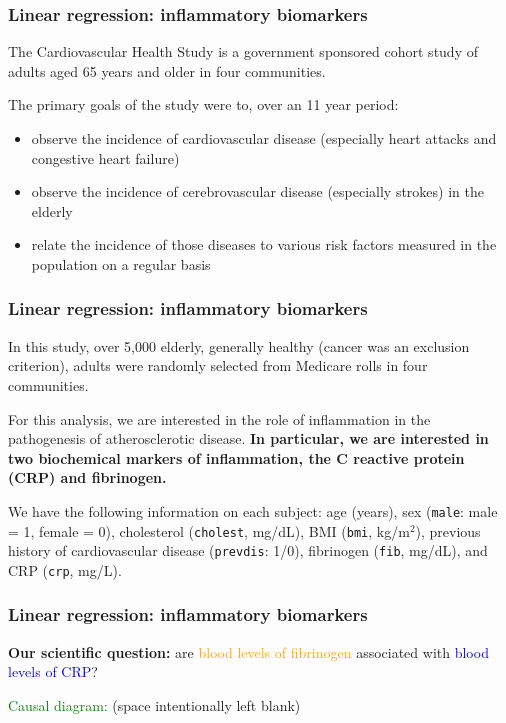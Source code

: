 \documentclass[12pt, 
hyperref={colorlinks=true, linkcolor=blue, urlcolor=cyan},dvipsnames]{beamer}
\begin{document}
\begin{frame}
\frametitle{Linear regression: inflammatory biomarkers}
The Cardiovascular Health Study is a government sponsored cohort study of adults aged 65 years and older in four communities.

The primary goals of the study were to, over an 11 year period:\vspace{-0.3cm}
\begin{itemize}
\item observe the incidence of cardiovascular disease (especially heart attacks and congestive heart failure)
\item observe the incidence of cerebrovascular disease (especially strokes) in the elderly 
\item relate the incidence of those diseases to various risk factors measured in the population on a regular basis
\end{itemize}
\end{frame}

\begin{frame}
\frametitle{Linear regression: inflammatory biomarkers}
In this study, over 5,000 elderly, generally healthy (cancer was an exclusion criterion), adults were randomly selected from Medicare rolls in four communities.

For this analysis, we are interested in the role of inflammation in the pathogenesis of atherosclerotic disease. \textbf{In particular, we are interested in two biochemical markers of inflammation, the C reactive protein (CRP) and fibrinogen.}

We have the following information on each subject: age (years), sex (\texttt{male}: male = 1, female = 0), cholesterol (\texttt{cholest}, mg/dL), BMI (\texttt{bmi}, kg/m${}^2$), previous history of cardiovascular disease (\texttt{prevdis}: 1/0), fibrinogen (\texttt{fib}, mg/dL), and CRP (\texttt{crp}, mg/L).
\end{frame}

\begin{frame}
\frametitle{Linear regression: inflammatory biomarkers}
\textbf{Our scientific question:} are \textcolor{orange}{blood levels of fibrinogen} associated with \textcolor{blue}{blood levels of CRP}? \pause

\textcolor{green}{Causal diagram: } {\small (space intentionally left blank)} \vspace{5cm}

\end{frame}
\end{document}
